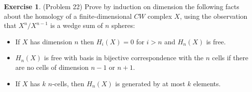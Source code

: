\documentclass[psamsfonts]{amsart}
\theoremstyle{definition}
\newtheorem*{exer}{Exercise}
\theoremstyle{remark}
\numberwithin{equation}{section}
\begin{document}
\begin{exer}{(Problem 22)}
  Prove by induction on dimension the following facts about the homology of a finite-dimensional $CW$ complex $X$, using the observation that $X^n / X^{n-1}$ is a wedge sum of $n$ spheres:
  \begin{itemize}
    \item
      If $X$ has dimension $n$ then $H_i(X) = 0$ for $i > n$ and $H_n(X)$ is free.
    \item
      $H_n(X)$ is free with basis in bijective correspondence with the $n$ cells if there are no cells of dimension $n - 1$ or $n + 1$.
    \item
      If $X$ has $k$ $n$-cells, then $H_n(X)$ is generated by at most $k$ elements.
  \end{itemize}
\end{exer}
\end{document}
